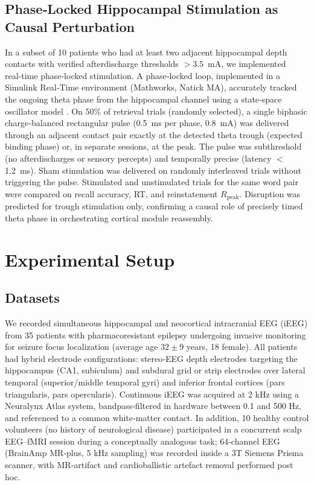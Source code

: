 \documentclass{article}
\begin{document}
\subsection{Phase‑Locked Hippocampal Stimulation as Causal Perturbation}
In a subset of 10 patients who had at least two adjacent hippocampal depth contacts with verified afterdischarge thresholds $>3.5$~mA, we implemented real‑time phase‑locked stimulation. A phase‑locked loop, implemented in a Simulink Real‑Time environment (Mathworks, Natick MA), accurately tracked the ongoing theta phase from the hippocampal channel using a state‑space oscillator model \cite{zrenner2020}. On 50\% of retrieval trials (randomly selected), a single biphasic charge‑balanced rectangular pulse (0.5~ms per phase, 0.8~mA) was delivered through an adjacent contact pair exactly at the detected theta trough (expected binding phase) or, in separate sessions, at the peak. The pulse was subthreshold (no afterdischarges or sensory percepts) and temporally precise (latency $<$ 1.2~ms). Sham stimulation was delivered on randomly interleaved trials without triggering the pulse. Stimulated and unstimulated trials for the same word pair were compared on recall accuracy, RT, and reinstatement $R_{\text{peak}}$. Disruption was predicted for trough stimulation only, confirming a causal role of precisely timed theta phase in orchestrating cortical module reassembly.

\section{Experimental Setup}

\subsection{Datasets}
We recorded simultaneous hippocampal and neocortical intracranial EEG (iEEG) from 35 patients with pharmacoresistant epilepsy undergoing invasive monitoring for seizure focus localization (average age $32 \pm 9$ years, 18 female). All patients had hybrid electrode configurations: stereo‑EEG depth electrodes targeting the hippocampus (CA1, subiculum) and subdural grid or strip electrodes over lateral temporal (superior/middle temporal gyri) and inferior frontal cortices (pars triangularis, pars opercularis). Continuous iEEG was acquired at 2 kHz using a Neuralynx Atlas system, bandpass‑filtered in hardware between 0.1 and 500 Hz, and referenced to a common white‑matter contact. In addition, 10 healthy control volunteers (no history of neurological disease) participated in a concurrent scalp EEG–fMRI session during a conceptually analogous task; 64‑channel EEG (BrainAmp MR‑plus, 5 kHz sampling) was recorded inside a 3T Siemens Prisma scanner, with MR‑artifact and cardioballistic artefact removal performed post hoc.
\end{document}
